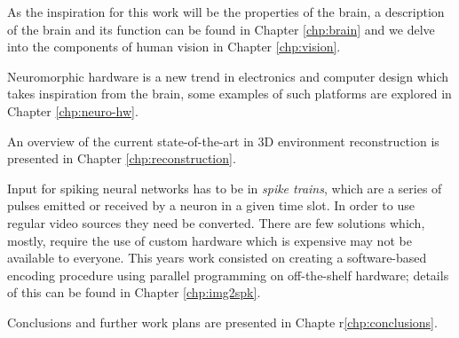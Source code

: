 As the inspiration for this work will be the properties of the brain, a description of the brain and its function can be found in Chapter \ref{chp:brain} and we delve into the components of human vision in Chapter \ref{chp:vision}.  

Neuromorphic hardware is a new trend in electronics and computer design which takes inspiration from the brain, some examples of such platforms are explored in Chapter \ref{chp:neuro-hw}.

An overview of the current state-of-the-art in 3D environment reconstruction is presented in Chapter \ref{chp:reconstruction}.

Input for spiking neural networks has to be in \emph{spike trains}, which are a series of pulses emitted or received by a neuron in a given time slot. In order to use regular video sources they need be converted. There are few solutions which, mostly, require the use of custom hardware which is expensive may not be available to everyone. This years work consisted on creating a software-based encoding procedure using parallel programming on off-the-shelf hardware; details of this can be found in Chapter \ref{chp:img2spk}. 

Conclusions and further work plans are presented in Chapte r\ref{chp:conclusions}.